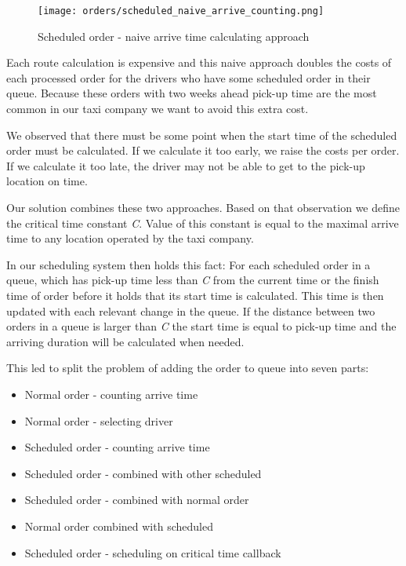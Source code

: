 \begin{figure}[h]\centering
	\texttt{[image: orders/scheduled\_naive\_arrive\_counting.png]}
	\caption{Scheduled order - naive arrive time calculating approach} 
	\label{scheduled_naive_arrive_counting}
\end{figure} 

Each route calculation is expensive and this naive approach doubles the costs of each processed order for the drivers who have some scheduled order in their queue. Because these orders with two weeks ahead pick-up time are the most common in our taxi company we want to avoid this extra cost. 

We observed that there must be some point when the start time of the scheduled order must be calculated. If we calculate it too early, we raise the costs per order. If we calculate it too late, the driver may not be able to get to the pick-up location on time. 

Our solution combines these two approaches. Based on that observation we define the critical time constant \textit{C}. Value of this constant is equal to the maximal arrive time to any location operated by the taxi company. 

In our scheduling system then holds this fact: For each scheduled order in a queue, which has pick-up time less than \textit{C} from the current time or the finish time of order before it holds that its start time is calculated. This time is then updated with each relevant change in the queue. If the distance between two orders in a queue is larger than \textit{C} the start time is equal to pick-up time and the arriving duration will be calculated when needed.

This led to split the problem of adding the order to queue into seven parts:
\begin{itemize}
	\item Normal order - counting arrive time
	\item Normal order - selecting driver
	\item Scheduled order - counting arrive time
	\item Scheduled order - combined with other scheduled
	\item Scheduled order - combined with normal order
	\item Normal order combined with scheduled
	\item Scheduled order - scheduling on critical time callback 
\end{itemize}

